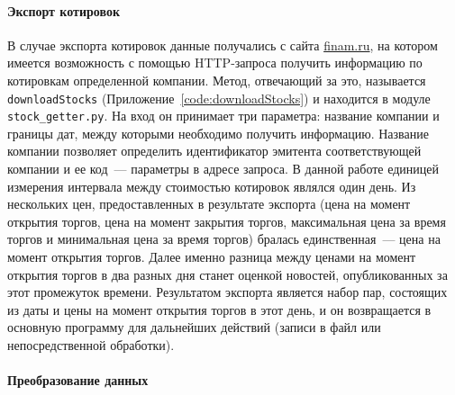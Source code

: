 \documentclass[14pt]{matmex-diploma-custom}
\begin{document}
\paragraph{Экспорт котировок}

В случае экспорта котировок данные получались с сайта \url{finam.ru}, на котором имеется возможность с помощью HTTP-запроса получить информацию по котировкам определенной компании. Метод, отвечающий за это, называется \texttt{downloadStocks} (Приложение~\ref{code:downloadStocks}) и находится в модуле \texttt{stock\_getter.py}. На вход он принимает три параметра: название компании и границы дат, между которыми необходимо получить информацию. Название компании позволяет определить идентификатор эмитента соответствующей компании и ее код~--- параметры в адресе запроса. В данной работе единицей измерения интервала между стоимостью котировок являлся один день. Из нескольких цен, предоставленных в результате экспорта (цена на момент открытия торгов, цена на момент закрытия торгов, максимальная цена за время торгов и минимальная цена за время торгов) бралась единственная~--- цена на момент открытия торгов. Далее именно разница между ценами на момент открытия торгов в два разных дня станет оценкой новостей, опубликованных за этот промежуток времени. Результатом экспорта является набор пар, состоящих из даты и цены на момент открытия торгов в этот день, и он возвращается в основную программу для дальнейших действий (записи в файл или непосредственной обработки).

\paragraph{Преобразование данных}
\end{document}
